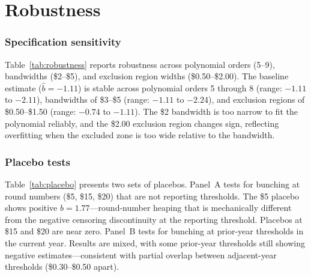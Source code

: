 \documentclass[12pt]{article}
\begin{document}


\section{Robustness}

\subsubsection*{Specification sensitivity} Table~\ref{tab:robustness} reports robustness across polynomial orders (5--9), bandwidths (\$2--\$5), and exclusion region widths (\$0.50--\$2.00). The baseline estimate ($\hat{b} = -1.11$) is stable across polynomial orders 5 through 8 (range: $-1.11$ to $-2.11$), bandwidths of \$3--\$5 (range: $-1.11$ to $-2.24$), and exclusion regions of \$0.50--\$1.50 (range: $-0.74$ to $-1.11$). The \$2 bandwidth is too narrow to fit the polynomial reliably, and the \$2.00 exclusion region changes sign, reflecting overfitting when the excluded zone is too wide relative to the bandwidth.



\subsubsection*{Placebo tests} Table~\ref{tab:placebo} presents two sets of placebos. Panel~A tests for bunching at round numbers (\$5, \$15, \$20) that are not reporting thresholds. The \$5 placebo shows positive $\hat{b} = 1.77$---round-number heaping that is mechanically different from the negative censoring discontinuity at the reporting threshold. Placebos at \$15 and \$20 are near zero. Panel~B tests for bunching at prior-year thresholds in the current year. Results are mixed, with some prior-year thresholds still showing negative estimates---consistent with partial overlap between adjacent-year thresholds (\$0.30--\$0.50 apart).


\end{document}
